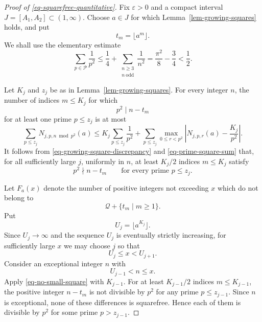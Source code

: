 \documentclass[11pt,reqno]{amsart}
\numberwithin{equation}{section}
\begin{document}
    \begin{proof}[Proof of \eqref{eq-squarefree-quantitative}]
        Fix $\varepsilon>0$ and a compact interval $J=[A_1,A_2]\subset(1,\infty)$. Choose $a\in J$ for which Lemma~\ref{lem-growing-squares} holds, and put
        $$
        t_m=\lfloor a^m\rfloor.
        $$
        We shall use the elementary estimate
        \begin{equation}\label{eq-prime-square-sum}
            \sum_{p\in\mathcal{P}}\frac1{p^2}
            \le
            \frac14+
            \sum_{\substack{n\ge3\\n\ \mathrm{odd}}}\frac1{n^2}
            =
            \frac{\pi^2}{8}-\frac34
            <\frac12.
        \end{equation}

        Let $K_j$ and $z_j$ be as in Lemma~\ref{lem-growing-squares}. For every integer $n$, the number of indices $m\le K_j$ for which
        $$
        p^2\mid n-t_m
        $$
        for at least one prime $p\le z_j$ is at most
        $$
        \sum_{p\le z_j}N_{j,p,n\bmod p^2}(a)
        \le
        K_j\sum_{p\le z_j}\frac1{p^2}
        +
        \sum_{p\le z_j}
        \max_{0\le r<p^2}
        \left|N_{j,p,r}(a)-\frac{K_j}{p^2}\right|.
        $$
        It follows from \eqref{eq-growing-square-discrepancy} and \eqref{eq-prime-square-sum} that, for all sufficiently large $j$, uniformly in $n$, at least $K_j/2$ indices $m\le K_j$ satisfy
        \begin{equation}\label{eq-no-small-square}
            p^2\nmid n-t_m
            \qquad
            \text{for every prime }p\le z_j.
        \end{equation}

        Let $F_a(x)$ denote the number of positive integers not exceeding $x$ which do not belong to
        $$
        \mathcal{Q}+\{t_m\mid m\ge1\}.
        $$
        Put
        $$
        U_j=\lfloor a^{K_j}\rfloor.
        $$
        Since $U_j\to\infty$ and the sequence $U_j$ is eventually strictly increasing, for sufficiently large $x$ we may choose $j$ so that
        $$
        U_j\le x<U_{j+1}.
        $$
        Consider an exceptional integer $n$ with
        $$
        U_{j-1}<n\le x.
        $$
        Apply \eqref{eq-no-small-square} with $K_{j-1}$. For at least $K_{j-1}/2$ indices $m\le K_{j-1}$, the positive integer $n-t_m$ is not divisible by $p^2$ for any prime $p\le z_{j-1}$. Since $n$ is exceptional, none of these differences is squarefree. Hence each of them is divisible by $p^2$ for some prime $p>z_{j-1}$.


\end{proof}
\end{document}
